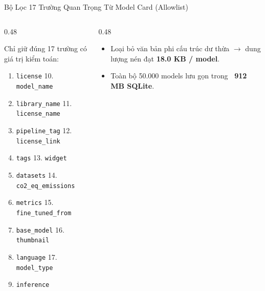 \documentclass[aspectratio=169, xcolor=table]{beamer}
\begin{document}
\begin{frame}{Bộ Lọc 17 Trường Quan Trọng Từ Model Card (Allowlist)}
    \begin{columns}[onlytextwidth, T]
        \begin{column}{0.48\textwidth}
            \begin{infobox}
                \scriptsize
                Chỉ giữ đúng 17 trường có giá trị kiểm toán:
                \begin{enumerate}
                    \tiny
                    \item \texttt{license} \hfill 10. \texttt{model\_name}
                    \item \texttt{library\_name} \hfill 11. \texttt{license\_name}
                    \item \texttt{pipeline\_tag} \hfill 12. \texttt{license\_link}
                    \item \texttt{tags} \hfill 13. \texttt{widget}
                    \item \texttt{datasets} \hfill 14. \texttt{co2\_eq\_emissions}
                    \item \texttt{metrics} \hfill 15. \texttt{fine\_tuned\_from}
                    \item \texttt{base\_model} \hfill 16. \texttt{thumbnail}
                    \item \texttt{language} \hfill 17. \texttt{model\_type}
                    \item \texttt{inference}
                \end{enumerate}
            \end{infobox}
        \end{column}
        \hfill
        \begin{column}{0.48\textwidth}
            \begin{successbox}
                \scriptsize
                \begin{itemize}
                    \item Loại bỏ văn bản phi cấu trúc dư thừa $\to$ dung lượng nén đạt \textbf{18.0 KB / model}.
                    \item Toàn bộ 50.000 models lưu gọn trong \textbf{~912 MB SQLite}.
                \end{itemize}
            \end{successbox}
        \end{column}
    \end{columns}
\end{frame}
\end{document}
